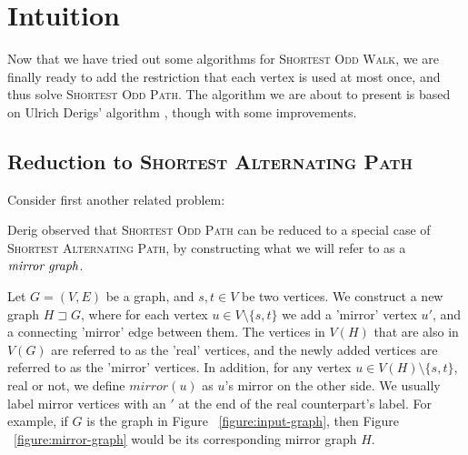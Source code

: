 \section{Intuition}
Now that we have tried out some algorithms for \textsc{Shortest Odd Walk}, we are finally ready to add the restriction that each vertex is used at most once, and thus solve \textsc{Shortest Odd Path}. The algorithm we are about to present is based on Ulrich Derigs' algorithm \cite{source:derigs_shortest_odd_path}, though with some improvements.

\subsection{Reduction to \textsc{Shortest Alternating Path}}
\label{subsection:reduction}
Consider first another related problem:


Derig observed that \textsc{Shortest Odd Path} can be reduced to a special case of \textsc{Shortest Alternating Path}, by constructing what we will refer to as a $\emph{mirror graph}$.

\begin{definition}
    \label{def:mirror-graph}
    Let $G = (V, E)$ be a graph, and $s,t \in V$ be two vertices.
    We construct a new graph $H \sqsupset G$, where for each vertex $u \in V \setminus \{s,t\}$ we add a 'mirror' vertex $u'$, and a connecting 'mirror' edge between them. 
    The vertices in $V(H)$ that are also in $V(G)$ are referred to as the 'real' vertices, and the newly added vertices are referred to as the 'mirror' vertices. In addition, for any vertex $u \in V(H) \setminus \{s,t\}$, real or not, we define $mirror(u)$ as $u$'s mirror on the other side. We usually label mirror vertices with an $'$ at the end of the real counterpart's label.
    For example, if $G$ is the graph in Figure ~\ref{figure:input-graph}, then Figure ~\ref{figure:mirror-graph} would be its corresponding mirror graph $H$.
\end{definition}

